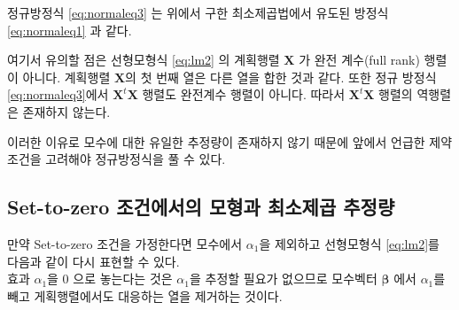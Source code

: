 \documentclass[
  10pt,
]{book}
\theoremstyle{definition}
\theoremstyle{definition}
\theoremstyle{definition}
\theoremstyle{definition}
\theoremstyle{remark}
\begin{document}
정규방정식 \eqref{eq:normaleq3} 는 위에서 구한 최소제곱법에서 유도된 방정식 \eqref{eq:normaleq1} 과 같다.

여기서 유의할 점은 선형모형식 \eqref{eq:lm2} 의 계획행렬 \(\bm X\) 가 완전 계수(full rank) 행렬이 아니다.
계획행렬 \(\bm X\)의 첫 번째 열은 다른 열을 합한 것과 같다.
또한 정규 방정식 \eqref{eq:normaleq3}에서 \(\bm X^t \bm X\) 행렬도 완전계수 행렬이 아니다.
따라서 \(\bm X^t \bm X\) 행렬의 역행렬은 존재하지 않는다.

이러한 이유로 모수에 대한 유일한 추정량이 존재하지 않기 때문에 앞에서 언급한 제약 조건을 고려해야 정규방정식을 풀 수 있다.

\hypertarget{set-to-zero-uxc870uxac74uxc5d0uxc11cuxc758-uxbaa8uxd615uxacfc-uxcd5cuxc18cuxc81cuxacf1-uxcd94uxc815uxb7c9}{%
\subsection{Set-to-zero 조건에서의 모형과 최소제곱 추정량}\label{set-to-zero-uxc870uxac74uxc5d0uxc11cuxc758-uxbaa8uxd615uxacfc-uxcd5cuxc18cuxc81cuxacf1-uxcd94uxc815uxb7c9}}

만약 Set-to-zero 조건을 가정한다면 모수에서 \(\alpha_1\)을 제외하고 선형모형식 \eqref{eq:lm2}를 다음과 같이 다시 표현할 수 있다.\\
효과 \(\alpha_1\)을 0 으로 놓는다는 것은 \(\alpha_1\)을 추정할 필요가 없으므로 모수벡터 \(\bm \beta\) 에서 \(\alpha_1\)를 빼고
게획행렬에서도 대응하는 열을 제거하는 것이다.
\end{document}

